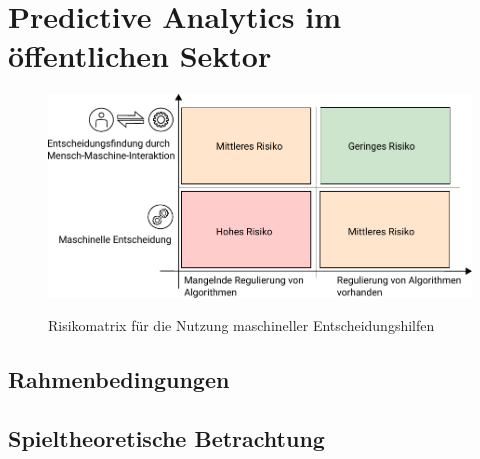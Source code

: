\documentclass[12pt,a4paper,listof=totoc,oneside]{scrreprt}
\begin{document}










\tableofcontents
\setcounter{page}{1}





\chapter{Predictive Analytics im öffentlichen Sektor}


\begin{figure}%
\centering
\caption{Risikomatrix für die Nutzung maschineller Entscheidungshilfen}
\includegraphics[scale=1.0]{Grafiken/Risk_Matrix_Ink.pdf} 
\label{pic:Risiko_Matrix}
\end{figure}

\section{Rahmenbedingungen}


\section{Spieltheoretische Betrachtung}
\end{document}
